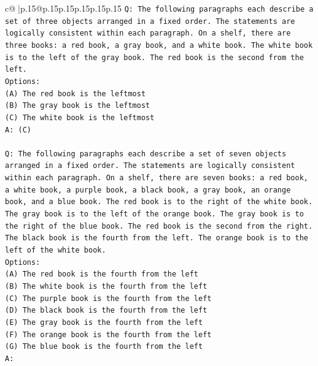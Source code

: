 \documentclass{article}
\begin{document}
{\begin{supertabular}{c@{$\;$}|p{.15\linewidth}@{}p{.15\linewidth}p{.15\linewidth}p{.15\linewidth}p{.15\linewidth}p{.15\linewidth}}
{{{\texttt{Q: The following paragraphs each describe a set of three objects arranged in a fixed order. The statements are logically consistent within each paragraph. On a shelf, there are three books: a red book, a gray book, and a white book. The white book is to the left of the gray book. The red book is the second from the left.} \\
\texttt{Options:} \\
\texttt{(A) The red book is the leftmost} \\
\texttt{(B) The gray book is the leftmost} \\
\texttt{(C) The white book is the leftmost} \\
\texttt{A: (C)} \\
\\ 
\texttt{Q: The following paragraphs each describe a set of seven objects arranged in a fixed order. The statements are logically consistent within each paragraph. On a shelf, there are seven books: a red book, a white book, a purple book, a black book, a gray book, an orange book, and a blue book. The red book is to the right of the white book. The gray book is to the left of the orange book. The gray book is to the right of the blue book. The red book is the second from the right. The black book is the fourth from the left. The orange book is to the left of the white book.} \\
\texttt{Options:} \\
\texttt{(A) The red book is the fourth from the left} \\
\texttt{(B) The white book is the fourth from the left} \\
\texttt{(C) The purple book is the fourth from the left} \\
\texttt{(D) The black book is the fourth from the left} \\
\texttt{(E) The gray book is the fourth from the left} \\
\texttt{(F) The orange book is the fourth from the left} \\
\texttt{(G) The blue book is the fourth from the left} \\
\texttt{A:} \\
            }
        }
    }
     \\ \\


\end{supertabular}}
\end{document}
